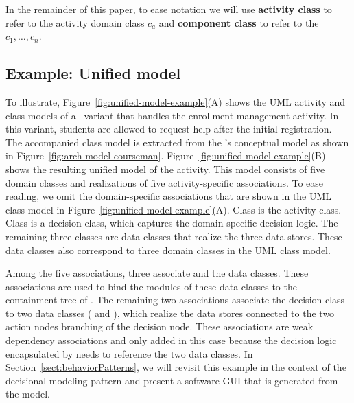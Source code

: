 In the remainder of this paper, to ease notation we will use \textbf{activity class} to refer to the activity domain class $ c_a $ and \textbf{component class} to refer to the $ c_1,\dots,c_n $. 
%
\subsection*{Example: Unified model}
%

To illustrate, Figure~\ref{fig:unified-model-example}(A) shows the UML activity and class models of a \courseman~variant that handles the enrollment management activity. In this variant, students are allowed to request help after the initial registration. The accompanied class model is extracted from the \courseman's conceptual model as shown in Figure~\ref{fig:arch-model-courseman}.
%
Figure~\ref{fig:unified-model-example}(B) shows the resulting unified model of the activity.
This model consists of five domain classes and realizations of five activity-specific associations. To ease reading, we omit the domain-specific associations that are shown in the UML class model in Figure~\ref{fig:unified-model-example}(A). Class  is the activity class. Class  is a decision class, which captures the domain-specific decision logic. The remaining three classes are data classes that realize the three data stores. These data classes also correspond to three domain classes in the UML class model. 

Among the five associations, three associate  and the data classes. These associations are used to bind the modules of these data classes to the containment tree of .
The remaining two associations associate the decision class  to two data classes ( and ), which realize the data stores connected to the two action nodes branching of the decision node. These associations are weak dependency associations and only added in this case because the decision logic encapsulated by  needs to reference the two data classes.
%
In Section~\ref{sect:behaviorPatterns}, we will revisit this example in the context of the decisional modeling pattern and present a software GUI that is generated from the model.
